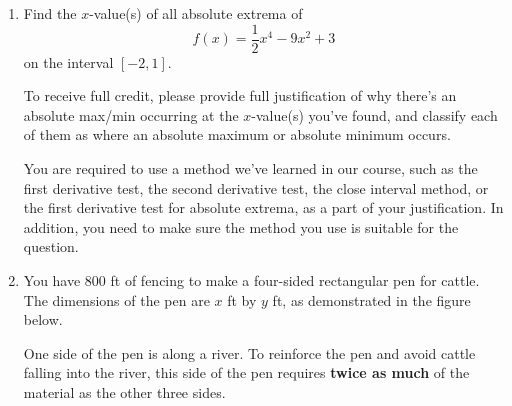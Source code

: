 \documentclass[11pt]{article}
\begin{document}
\begin{enumerate}
\begin{enumerate}
    {\large
        \[\text{Critical numbers: } \rule[-8pt]{4in}{0.4pt}\]
    }

    \item At what $x$-values does $f(x)$ have its inflection points?

    {\large
        \[\text{Inflection points ($x$-value(s) only): } \rule[-8pt]{3in}{0.4pt}\]
    }
\end{enumerate}


\newpage


\item Find the $x$-value(s) of all absolute extrema of  \[f(x)=\dfrac{1}{2}x^4-9x^2+3\] on the interval $[-2, 1]$.

To receive full credit, please provide full justification of why there's an absolute max/min occurring at the $x$-value(s) you've found, and classify each of them as where an absolute maximum or absolute minimum occurs.

You are required to use a method we've learned in our course, such as the first derivative test, the second derivative test, the close interval method, or the first derivative test for absolute extrema, as a part of your justification. In addition, you need to make sure the method you use is suitable for the question.


\newpage


\item You have 800 ft of fencing to make a four-sided rectangular pen for cattle. The dimensions of the pen are $x$ ft by $y$ ft, as demonstrated in the figure below.

One side of the pen is along a river. To reinforce the pen and avoid cattle falling into the river, this side of the pen requires \textbf{twice as much} of the material as the other three sides. 


\end{enumerate}
\end{document}
